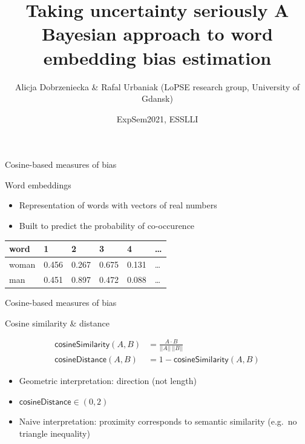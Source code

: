 \documentclass[10pt,ignorenonframetext,x11names, dvipsnames, bibspacing,natbib]{beamer}
\title{\Large Taking uncertainty seriously \newline \normalsize A Bayesian
approach to word embedding bias estimation}
\author{Alicja Dobrzeniecka \& Rafal Urbaniak \footnotesize \newline (LoPSE
research group, University of Gdansk)}
\date{ExpSem2021, ESSLLI}
\begin{document}
\frame{\titlepage}

\begin{frame}{Cosine-based measures of bias}

\begin{block}{Word embeddings}

\begin{itemize}
\item
  Representation of words with vectors of real numbers
\item
  Built to predict the probability of co-occurence
\end{itemize}

\begin{longtable}[]{@{}llllll@{}}
\toprule
word & 1 & 2 & 3 & 4 & \ldots{}\tabularnewline
\midrule
\endhead
woman & 0.456 & 0.267 & 0.675 & 0.131 & \ldots{}\tabularnewline
man & 0.451 & 0.897 & 0.472 & 0.088 & \ldots{}\tabularnewline
\bottomrule
\end{longtable}

\end{block}

\end{frame}

\begin{frame}{Cosine-based measures of bias}

\begin{block}{Cosine similarity \& distance}

\vspace{-4mm}

\begin{align} \tag{Sim}
\mathsf{cosineSimilarity}(A,B) & = \frac{A \cdot B}{\vert \vert A \vert \vert \,\vert \vert B \vert \vert}
\\
\tag{Distance}
\mathsf{cosineDistance}(A,B) &  = 1 - \mathsf{cosineSimilarity}(A,B)
\end{align}

\begin{itemize}
\item
  Geometric interpretation: direction (not length)
\item
  \(\mathsf{cosineDistance}\in (0, 2)\)
\item
  Naive interpretation: proximity corresponds to semantic similarity
  (e.g.~no triangle inequality)
\end{itemize}

\end{block}

\end{frame}
\end{document}
